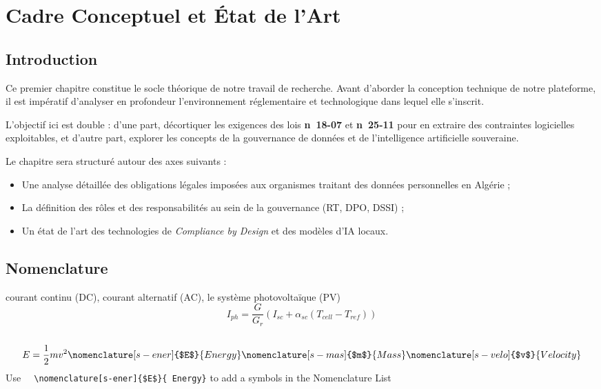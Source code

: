 \chapter{Cadre Conceptuel et État de l'Art}
\section{Introduction}
Ce premier chapitre constitue le socle théorique de notre travail de recherche.
Avant d'aborder la conception technique de notre plateforme, il est impératif d'analyser
en profondeur l'environnement réglementaire et technologique dans lequel elle s'inscrit.

L'objectif ici est double : d'une part, décortiquer les exigences des lois
\textbf{n\textdegree~18-07} et \textbf{n\textdegree~25-11} pour en extraire des
contraintes logicielles exploitables, et d'autre part, explorer les concepts de
la gouvernance de données et de l'intelligence artificielle souveraine.

Le chapitre sera structuré autour des axes suivants :
\begin{itemize}
	\item Une analyse détaillée des obligations légales imposées aux organismes traitant
		des données personnelles en Algérie ;

	\item La définition des rôles et des responsabilités au sein de la gouvernance
		(RT, DPO, DSSI) ;

	\item Un état de l'art des technologies de \textit{Compliance by Design} et
		des modèles d'IA locaux.
\end{itemize}
\section{Nomenclature }
courant continu (DC),
courant alternatif (AC),
le système photovoltaïque (PV) 
\begin{equation}
	\label{Iph}I_{ph}=\frac{G}{G_{r}}\left(I_{sc}+\alpha_{sc}(T_{cell}-T_{ref})\right
	)
\end{equation}
\\
\begin{equation}
	E=\frac{1}{2}mv^{2}\nomenclature[s-ener]{$E$}{ Energy}\nomenclature[s-mas]{$m$}
	{ Mass}\nomenclature[s-velo]{$v$}{ Velocity}
\end{equation}
Use \verb|	\nomenclature[s-ener]{$E$}{ Energy}| to add a symbols in the Nomenclature
List


